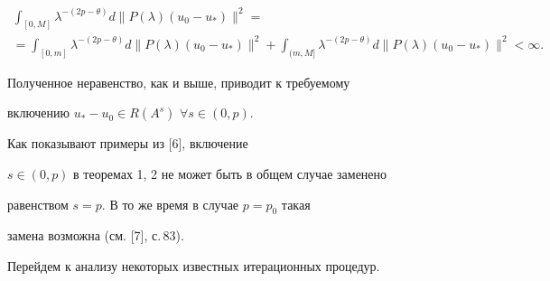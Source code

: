 \begin{pf}
\begin{multline*}  


\int_{[0,M]}\lambda^{-(2p-\theta)} 


d\|P(\lambda)(u_0-u_*)\|^2= \\


%


=\int_{[0,m]}\lambda^{-(2p-\theta)} 


d\|P(\lambda)(u_0-u_*)\|^2+ 


\int_{(m,M]}\lambda^{-(2p-\theta)} 


d\|P(\lambda)(u_0-u_*)\|^2<\infty. 


\end{multline*}  


Полученное неравенство, как и выше, приводит к требуемому 


включению $u_*-u_0\in R(A^s)$ $\forall s\in(0,p)$. 


\end{pf} 


 


Как показывают примеры из [6], включение 


$s\in(0,p)$ в теоремах 1, 2 не может быть в общем случае заменено 


равенством $s=p$. В то же время в случае $p=p_0$ такая 


замена возможна (см. [7], с.\,83). 


 


Перейдем к анализу некоторых известных итерационных процедур. 


 


